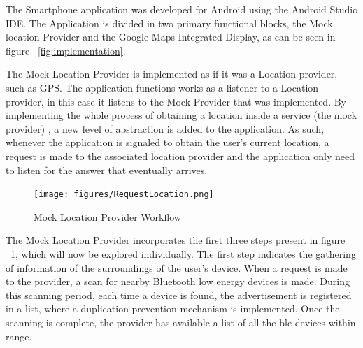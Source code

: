 \documentclass[a4paper]{IEEEtran}
\begin{document}
 
The Smartphone application was developed for Android using the Android Studio IDE. The Application is divided in two primary functional blocks, the Mock location Provider and the Google Maps Integrated Display, as can be seen in figure ~\ref{fig:implementation}. 
 
 
The Mock Location Provider is implemented as if it was a Location provider, such as GPS. The application functions works as a listener to a Location provider, in this case it listens to the Mock Provider that was implemented. By implementing the whole process of obtaining a location inside a service (the mock provider) , a new level of abstraction is added to the application. As such, whenever the application is signaled to obtain the user's current location, a request is made to the associated location provider and the application only need to listen for the answer that eventually arrives. 
 
 
\begin{figure} 
\centering 
\texttt{[image: figures/RequestLocation.png]} 
\caption[Mock Location Provider Workflow]{Mock Location Provider Workflow} 
\label{fig:MockProvider} 
\end{figure} 
 
 
The Mock Location Provider incorporates the first three steps present in figure ~\ref{fig:MockProvider}, which will now be explored individually. The first step indicates the gathering of information of the surroundings of the user's device. When a request is made to the provider, a scan for nearby Bluetooth low energy devices is made. During this scanning period, each time a device is found, the advertisement is registered in a list, where a duplication prevention mechanism is implemented. Once the scanning is complete, the provider has available a list of all the ble devices within range.    
 
\end{document}
